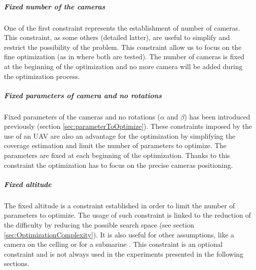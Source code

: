 %
\subparagraph{Fixed number of the cameras}
One of the first constraint represents the establishment of number of cameras. This constraint, as some others (detailed latter), are  useful to simplify and restrict the possibility of the problem. This constraint allow us to focus on the fine optimization (as in \citep{22*zhao2008} where both are tested). The number of cameras is fixed at the beginning of the optimization and no more camera will be added during the optimization process.  

\subparagraph{Fixed parameters of camera and no rotations}
Fixed parameters of the cameras and no rotations ($\alpha$ and $\beta$) has been introduced previously (section \ref{sec:parameterToOptimize}). These constraints imposed by the use of an UAV are also an advantage for the optimization by simplifying the coverage estimation and limit the number of parameters to optimize. The parameters are fixed at each beginning of the optimization. Thanks to this constraint the optimization  has to focus on the precise  cameras positioning.

\subparagraph{Fixed altitude}
 The fixed altitude is a constraint established in order to limit the number of parameters to optimize. The usage of such constraint is linked to the reduction of the difficulty by reducing the possible search space (see section \ref{sec:OptimizationComplexity}). It is also useful for other assumptions, like a camera on the celling or for a submarine  \cite{66*galceran2013}. This constraint is an optional constraint and is not always used in the experiments presented in the following sections.   

